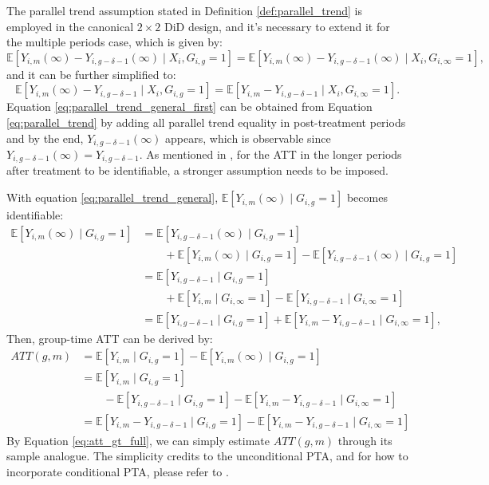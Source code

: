 The parallel trend assumption stated in Definition \ref{def:parallel_trend} is employed in the canonical $2 \times 2$ DiD design, and it's necessary to extend it for the multiple periods case, which is given by:
\begin{equation}\label{eq:parallel_trend_general_first}
\mathbb{E}[Y_{i, m}(\infty) - Y_{i, g-\delta-1}(\infty) \mid X_i, G_{i, g} = 1]
=
\mathbb{E}[Y_{i, m}(\infty) - Y_{i, g-\delta-1}(\infty) \mid X_i, G_{i, \infty} = 1],
\end{equation}
and it can be further simplified to:
\begin{equation}\label{eq:parallel_trend_general}
\mathbb{E}[Y_{i, m}(\infty) - Y_{i, g-\delta-1} \mid X_i, G_{i, g} = 1]
=
\mathbb{E}[Y_{i, m} - Y_{i, g-\delta-1} \mid X_i, G_{i, \infty} = 1].
\end{equation}
Equation \ref{eq:parallel_trend_general_first} can be obtained from Equation \ref{eq:parallel_trend} by adding all parallel trend equality in post-treatment periods and by the end, $Y_{i, g-\delta-1}(\infty)$ appears, which is observable since $Y_{i, g-\delta-1}(\infty) = Y_{i, g-\delta-1}$. As mentioned in \cite{roth2023s}, for the ATT in the longer periods after treatment to be identifiable, a stronger assumption needs to be imposed.

With equation \ref{eq:parallel_trend_general}, $\mathbb{E}[Y_{i, m}(\infty) \mid G_{i, g} = 1]$ becomes identifiable:
\begin{align}
\mathbb{E}[Y_{i, m}(\infty) \mid G_{i, g} = 1]
&=
\mathbb{E}[Y_{i, g-\delta-1}(\infty) \mid G_{i, g} = 1]
\nonumber \\
&\quad\quad
+\mathbb{E}[Y_{i, m}(\infty) \mid G_{i, g} = 1]
    - \mathbb{E}[Y_{i, g-\delta-1}(\infty) \mid G_{i, g} = 1]
\nonumber \\
&=
\mathbb{E}[Y_{i, g-\delta-1} \mid G_{i, g} = 1]
\nonumber \\
&\quad\quad
+\mathbb{E}[Y_{i, m} \mid G_{i, \infty} = 1]
- \mathbb{E}[Y_{i, g-\delta-1} \mid G_{i, \infty} = 1]
\nonumber \\
&=
\mathbb{E}[Y_{i, g-\delta-1} \mid G_{i, g} = 1]
+
\mathbb{E}[Y_{i, m} - Y_{i, g-\delta-1} \mid G_{i, \infty} = 1],
\end{align}
Then, group-time ATT can be derived by:
\begin{align} \label{eq:att_gt_full}
ATT(g, m)
&=
\mathbb{E}[
    Y_{i, m}
    \mid G_{i, g} = 1
]
-
\mathbb{E}[
    Y_{i, m}(\infty)
    \mid G_{i, g} = 1
]
\nonumber \\
&=
\mathbb{E}[
    Y_{i, m}
    \mid G_{i, g} = 1
]
\nonumber \\
&\quad\quad
- \mathbb{E}[Y_{i, g-\delta-1} \mid G_{i, g} = 1]
-
\mathbb{E}[Y_{i, m} - Y_{i, g-\delta-1} \mid G_{i, \infty} = 1]
\nonumber \\
&=
\mathbb{E}[Y_{i, m} - Y_{i, g-\delta-1} \mid G_{i, g} = 1]
-
\mathbb{E}[Y_{i, m} - Y_{i, g-\delta-1} \mid G_{i, \infty} = 1]
\end{align}
By Equation \ref{eq:att_gt_full}, we can simply estimate $ATT(g, m)$ through its sample analogue. The simplicity credits to the unconditional PTA, and for how to incorporate conditional PTA, please refer to \cite{callaway2021difference}.

